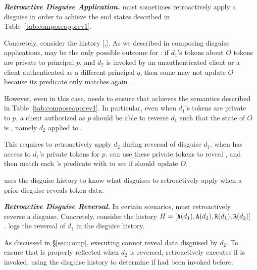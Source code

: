 \vspace{6pt}\noindent\textbf{\emph{Retroactive Disguise Application.}}
\sys must sometimes retroactively apply a disguise in order to achieve the end states
described in Table~\ref{tab:composeapprev1}. 

Concretely, consider the history [,].  As we described in composing disguise
applications, \appcomptwo may be the only possible outcome for : if $d_1$'s tokens
about $O$ tokens are private to principal $p$, and $d_2$ is invoked by an unauthenticated client or
a client authenticated as a different principal $q$, then some  may not update $O$ because
its predicate only matches again \ohist{[\app{d_1}]}.

However, even in this case, \sys needs to ensure that 
achieves the semantics described in Table~\ref{tab:composeapprev1}. In particular, even when $d_1$'s
tokens are private to $p$, a client authorized as $p$ should be able to reverse $d_1$ such that the
state of $O$ is \ohist{[\app{d_2}]}, namely $d_2$ applied to \ostart. 

This requires \sys to retroactively apply $d_2$ during reversal of disguise $d_1$, when \sys has
access to $d_1$'s private tokens for $p$. \sys can use these private tokens to reveal \ostart, and
then match each 's predicate with \ostart to see if  should update $O$.

\sys uses the disguise history to know what disguises to retroactively apply when a prior disguise
reveals token data.

\vspace{6pt}\noindent\textbf{\emph{Retroactive Disguise Reversal.}}
In certain scenarios, \sys must retroactively reverse a disguise. 
Concretely, consider the history $H = [\texttt{A}({d_1}),\texttt{A}({d_2}),\texttt{R}({d_1}),\texttt{R}({d_2})]$.
\sys logs the reversal of $d_1$ in the disguise history. 

As discussed in \S\ref{sec:comp}, executing  cannot reveal data disguised by $d_2$. To
ensure that  is properly reflected when $d_2$ is reversed, \sys retroactively executes
 if  is invoked, using the disguise history to determine if  had been invoked before.

